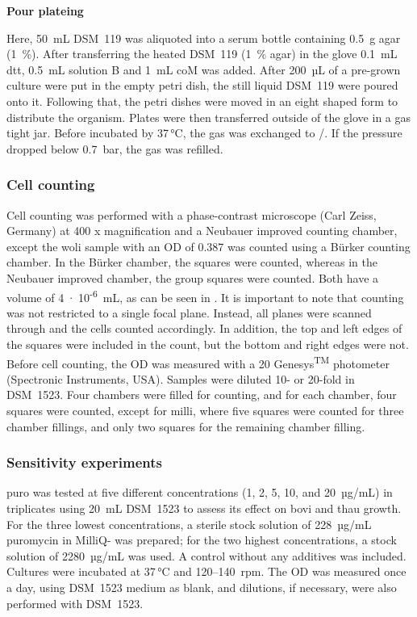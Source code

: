 \textbf{Pour \gls{plateing}}

\noindent Here, 50~mL DSM~119 was aliquoted into a serum bottle containing 0.5~g agar (1~\%). After transferring the heated DSM~119 (1~\% agar) in the \gls{glove} 0.1~mL \gls{dtt}, 0.5~mL solution B and 1~mL \acrshort{coM} was added. After 200~µL of a pre-grown culture were put in the empty petri dish, the still liquid DSM~119 were poured onto it. Following that, the petri dishes were moved in an eight shaped form to distribute the organism. Plates were then transferred outside of the \gls{glove} in a gas tight jar. Before incubated by 37\,°C, the gas was exchanged to /. If the pressure dropped below 0.7~bar, the gas was refilled.


\subsubsection{Cell counting}
Cell counting was performed with a phase-contrast microscope (Carl Zeiss, Germany) at 400 x magnification and a Neubauer improved counting chamber, except the \acrshort{woli} sample with an \acrfull{OD} of 0.387 was counted using a Bürker counting chamber. In the Bürker chamber, the squares were counted, whereas in the Neubauer improved chamber, the group squares were counted. Both have a volume of 4~$\cdot$~10\textsuperscript{-6}~mL, as can be seen in \citet{lo-laboroptikgmbhZaehlkammer2026}. It is important to note that counting was not restricted to a single focal plane. Instead, all planes were scanned through and the cells counted accordingly. In addition, the top and left edges of the squares were included in the count, but the bottom and right edges were not. Before cell counting, the \acrshort{OD} was measured with a 20 Genesys\textsuperscript{TM} photometer (Spectronic Instruments, USA). Samples were diluted 10- or 20-fold in DSM~1523. Four chambers were filled for counting, and for each chamber, four squares were counted, except for \acrshort{milli}, where five squares were counted for three chamber fillings, and only two squares for the remaining chamber filling. 

\subsubsection{Sensitivity experiments}

\Acrlong{puro} was tested at five different concentrations (1, 2, 5, 10, and 20~µg/mL) in triplicates using 20~mL DSM~1523 to assess its effect on \acrlong{bovi} and \acrshort{thau} growth. For the three lowest concentrations, a sterile stock solution of 228~µg/mL puromycin in MilliQ- was prepared; for the two highest concentrations, a stock solution of 2280~µg/mL was used. A control without any additives was included. Cultures were incubated at 37\,°C and 120--140~rpm. The \acrshort{OD} was measured once a day, using DSM~1523 medium as blank, and dilutions, if necessary, were also performed with DSM~1523. 

